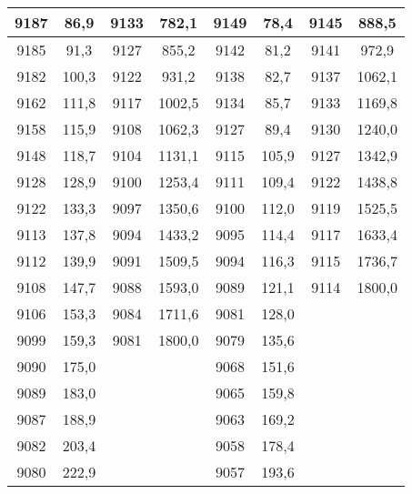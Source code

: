 \documentclass[11pt]{article}
\begin{document}
{{\begin{tabular}{|c|c|c|c|c|c|c|c|}
            \hline 
            9187 & 86,9 & \multicolumn{1}{c|}{9133} & 782,1 & 9149 & 78,4 & \multicolumn{1}{c|}{9145} & \multicolumn{1}{c|}{888,5}\tabularnewline
            \hline 
            9185 & 91,3 & \multicolumn{1}{c|}{9127} & 855,2 & 9142 & 81,2 & \multicolumn{1}{c|}{9141} & \multicolumn{1}{c|}{972,9}\tabularnewline
            \hline 
            9182 & 100,3 & \multicolumn{1}{c|}{9122} & 931,2 & 9138 & 82,7 & \multicolumn{1}{c|}{9137} & \multicolumn{1}{c|}{1062,1}\tabularnewline
            \hline 
            9162 & 111,8 & \multicolumn{1}{c|}{9117} & 1002,5 & 9134 & 85,7 & \multicolumn{1}{c|}{9133} & \multicolumn{1}{c|}{1169,8}\tabularnewline
            \hline 
            9158 & 115,9 & \multicolumn{1}{c|}{9108} & 1062,3 & 9127 & 89,4 & \multicolumn{1}{c|}{9130} & \multicolumn{1}{c|}{1240,0}\tabularnewline
            \hline 
            9148 & 118,7 & \multicolumn{1}{c|}{9104} & 1131,1 & 9115 & 105,9 & \multicolumn{1}{c|}{9127} & \multicolumn{1}{c|}{1342,9}\tabularnewline
            \hline 
            9128 & 128,9 & \multicolumn{1}{c|}{9100} & 1253,4 & 9111 & 109,4 & \multicolumn{1}{c|}{9122} & \multicolumn{1}{c|}{1438,8}\tabularnewline
            \hline 
            9122 & 133,3 & \multicolumn{1}{c|}{9097} & 1350,6 & 9100 & 112,0 & \multicolumn{1}{c|}{9119} & \multicolumn{1}{c|}{1525,5}\tabularnewline
            \hline 
            9113 & 137,8 & \multicolumn{1}{c|}{9094} & 1433,2 & 9095 & 114,4 & \multicolumn{1}{c|}{9117} & \multicolumn{1}{c|}{1633,4}\tabularnewline
            \hline 
            9112 & 139,9 & \multicolumn{1}{c|}{9091} & 1509,5 & 9094 & 116,3 & \multicolumn{1}{c|}{9115} & \multicolumn{1}{c|}{1736,7}\tabularnewline
            \hline 
            9108 & 147,7 & \multicolumn{1}{c|}{9088} & 1593,0 & 9089 & 121,1 & \multicolumn{1}{c|}{9114} & \multicolumn{1}{c|}{1800,0}\tabularnewline
            \hline 
            9106 & 153,3 & \multicolumn{1}{c|}{9084} & 1711,6 & 9081 & 128,0 &  & \tabularnewline
            \cline{1-6} 
            9099 & 159,3 & \multicolumn{1}{c|}{9081} & 1800,0 & 9079 & 135,6 &  & \tabularnewline
            \cline{1-6} 
            9090 & 175,0 &  &  & 9068 & 151,6 &  & \tabularnewline
            \cline{1-2} \cline{5-6} 
            9089 & 183,0 &  &  & 9065 & 159,8 &  & \tabularnewline
            \cline{1-2} \cline{5-6} 
            9087 & 188,9 &  &  & 9063 & 169,2 &  & \tabularnewline
            \cline{1-2} \cline{5-6} 
            9082 & 203,4 &  &  & 9058 & 178,4 &  & \tabularnewline
            \cline{1-2} \cline{5-6} 
            9080 & 222,9 &  &  & 9057 & 193,6 &  & \tabularnewline

\end{tabular}}}
\end{document}
